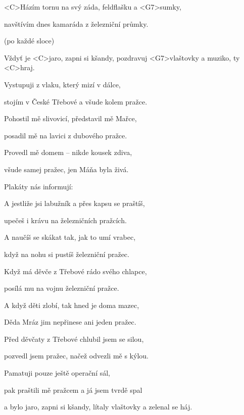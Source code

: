 

\zs
<C>Házím tornu na svý záda, feldflašku a <G7>sumky,

navštívím dnes kamaráda z železniční průmky.
\ks

\zr (po každé sloce)

Vždyť je <C>jaro, zapni si kšandy,
pozdravuj <G7>vlaštovky a muziko, ty <C>hraj.
\kr

\zs
Vystupuji z vlaku, který mizí v dálce,

stojím v České Třebové a všude kolem pražce.
\ks

\zs
Pohostil mě slivovicí, představil mě Mařce,

posadil mě na lavici z dubového pražce.
\ks

\zs
Provedl mě domem -- nikde kousek zdiva,

všude samej pražec, jen Máňa byla živá.
\ks

\zs
Plakáty nás informují: 
\ks

\zs
A jestliže jsi labužník a přes kapsu se praštíš,

upečeš i krávu na železničních pražcích.
\ks

\zs
A naučíš se skákat tak, jak to umí vrabec,

když na nohu si pustíš železniční pražec.
\ks

\zs
Když má děvče z Třebové rádo svého chlapce,

posílá mu na vojnu železniční pražce.
\ks

\zs
A když děti zlobí, tak hned je doma mazec,

Děda Mráz jim nepřinese ani jeden pražec.
\ks

\zs
Před děvčaty z Třebové chlubil jsem se silou,

pozvedl jsem pražec, načež odvezli mě s kýlou.
\ks

\zs
Pamatuji pouze ještě operační sál,

pak praštili mě pražcem a já jsem tvrdě spal
\ks

\zr
a bylo jaro, zapni si kšandy,
lítaly vlaštovky a zelenal se háj.
\kr

\kp
